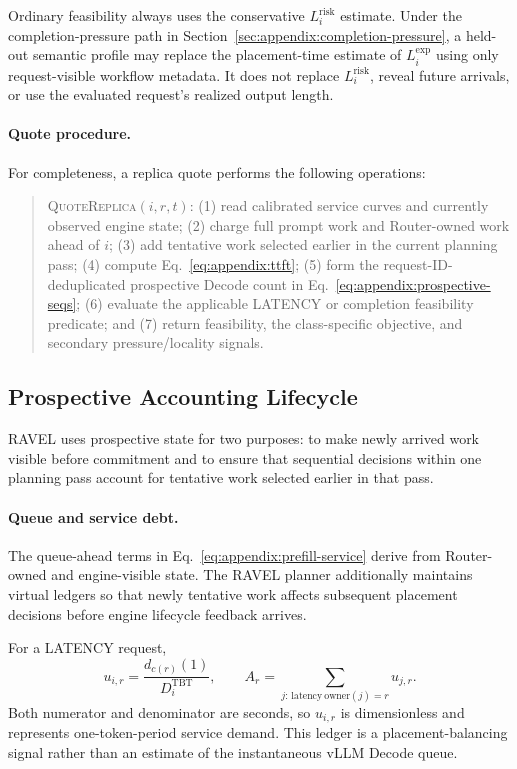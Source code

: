 Ordinary feasibility always uses the conservative
$L_i^{\mathrm{risk}}$ estimate.
Under the completion-pressure path in
Section~\ref{sec:appendix:completion-pressure}, a held-out semantic profile may
replace the placement-time estimate of $L_i^{\mathrm{exp}}$ using only
request-visible workflow metadata.
It does not replace $L_i^{\mathrm{risk}}$, reveal future arrivals, or use the
evaluated request's realized output length.

\paragraph{Quote procedure.}
For completeness, a replica quote performs the following operations:
\begin{quote}
\textsc{QuoteReplica}$(i,r,t)$:
(1) read calibrated service curves and currently observed engine state;
(2) charge full prompt work and Router-owned work ahead of $i$;
(3) add tentative work selected earlier in the current planning pass;
(4) compute Eq.~\ref{eq:appendix:ttft};
(5) form the request-ID-deduplicated prospective Decode count in
Eq.~\ref{eq:appendix:prospective-seqs};
(6) evaluate the applicable LATENCY or completion feasibility predicate; and
(7) return feasibility, the class-specific objective, and secondary
pressure/locality signals.
\end{quote}


\subsection{Prospective Accounting Lifecycle}
\label{sec:appendix:accounting}

RAVEL uses prospective state for two purposes: to make newly arrived work
visible before commitment and to ensure that sequential decisions within one
planning pass account for tentative work selected earlier in that pass.

\paragraph{Queue and service debt.}
The queue-ahead terms in Eq.~\ref{eq:appendix:prefill-service} derive from
Router-owned and engine-visible state.
The RAVEL planner additionally maintains virtual ledgers so that newly
tentative work affects subsequent placement decisions before engine lifecycle
feedback arrives.

For a LATENCY request,
\begin{equation}
    u_{i,r}
    =
    \frac{d_{c(r)}(1)}
         {D_i^{\mathrm{TBT}}},
    \qquad
    A_r
    =
    \sum_{j:\,\mathrm{latency\ owner}(j)=r}u_{j,r}.
    \label{eq:appendix:latency-ledger}
\end{equation}
Both numerator and denominator are seconds, so $u_{i,r}$ is dimensionless and
represents one-token-period service demand.
This ledger is a placement-balancing signal rather than an estimate of the
instantaneous vLLM Decode queue.

